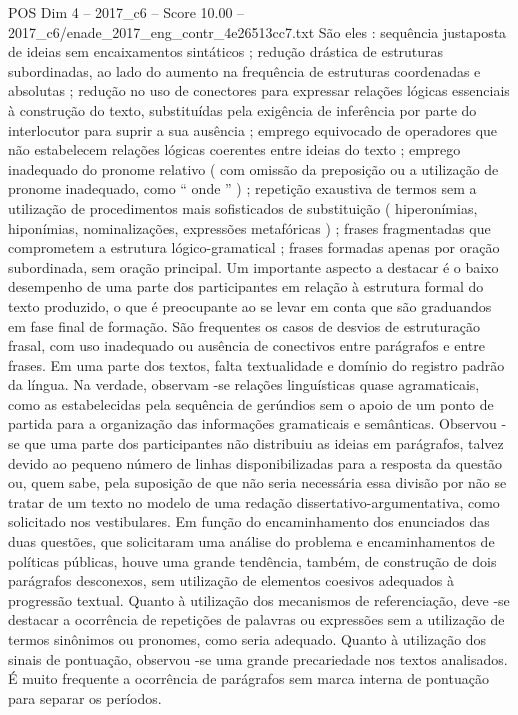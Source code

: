 \begin{textsample}{POS Dim 4 – 2017\_c6 – Score 10.00 – 2017\_c6/enade\_2017\_eng\_contr\_4e26513cc7.txt}
São eles : sequência justaposta de ideias sem encaixamentos sintáticos ; redução drástica de estruturas subordinadas, ao lado do aumento na frequência de estruturas coordenadas e absolutas ; redução no uso de conectores para expressar relações lógicas essenciais à construção do texto, substituídas pela exigência de inferência por parte do interlocutor para suprir a sua ausência ; emprego equivocado de operadores que não estabelecem relações lógicas coerentes entre ideias do texto ; emprego inadequado do pronome relativo ( com omissão da preposição ou a utilização de pronome inadequado, como “ onde ” ) ; repetição exaustiva de termos sem a utilização de procedimentos mais sofisticados de substituição ( hiperonímias, hiponímias, nominalizações, expressões metafóricas ) ; frases fragmentadas que comprometem a estrutura lógico-gramatical ; frases formadas apenas por oração subordinada, sem oração principal.
Um importante aspecto a destacar é o baixo desempenho de uma parte dos participantes em relação à estrutura formal do texto produzido, o que é preocupante ao se levar em conta que são graduandos em fase final de formação.
São frequentes os casos de desvios de estruturação frasal, com uso inadequado ou ausência de conectivos entre parágrafos e entre frases.
Em uma parte dos textos, falta textualidade e domínio do registro padrão da língua.
Na verdade, observam -se relações linguísticas quase agramaticais, como as estabelecidas pela sequência de gerúndios sem o apoio de um ponto de partida para a organização das informações gramaticais e semânticas.
Observou -se que uma parte dos participantes não distribuiu as ideias em parágrafos, talvez devido ao pequeno número de linhas disponibilizadas para a resposta da questão ou, quem sabe, pela suposição de que não seria necessária essa divisão por não se tratar de um texto no modelo de uma redação dissertativo-argumentativa, como solicitado nos vestibulares.
Em função do encaminhamento dos enunciados das duas questões, que solicitaram uma análise do problema e encaminhamentos de políticas públicas, houve uma grande tendência, também, de construção de dois parágrafos desconexos, sem utilização de elementos coesivos adequados à progressão textual.
Quanto à utilização dos mecanismos de referenciação, deve -se destacar a ocorrência de repetições de palavras ou expressões sem a utilização de termos sinônimos ou pronomes, como seria adequado.
Quanto à utilização dos sinais de pontuação, observou -se uma grande precariedade nos textos analisados.
É muito frequente a ocorrência de parágrafos sem marca interna de pontuação para separar os períodos.

\end{textsample}
